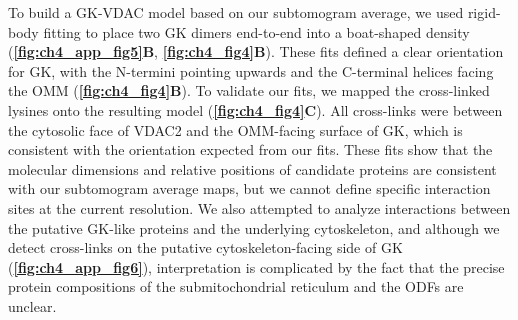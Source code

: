 To build a GK-VDAC model based on our subtomogram average, we used rigid-body fitting to place two GK dimers end-to-end into a boat-shaped density (\textbf{\autoref{fig:ch4_app_fig5}B}, \textbf{\autoref{fig:ch4_fig4}B}). These fits defined a clear orientation for GK, with the N-termini pointing upwards and the C-terminal helices facing the OMM (\textbf{\autoref{fig:ch4_fig4}B}). To validate our fits, we mapped the cross-linked lysines onto the resulting model (\textbf{\autoref{fig:ch4_fig4}C}). All cross-links were between the cytosolic face of VDAC2 and the OMM-facing surface of GK, which is consistent with the orientation expected from our fits. These fits show that the molecular dimensions and relative positions of candidate proteins are consistent with our subtomogram average maps, but we cannot define specific interaction sites at the current resolution. We also attempted to analyze interactions between the putative GK-like proteins and the underlying cytoskeleton, and although we detect cross-links on the putative cytoskeleton-facing side of GK (\textbf{\autoref{fig:ch4_app_fig6}}), interpretation is complicated by the fact that the precise protein compositions of the submitochondrial reticulum and the ODFs are unclear.

